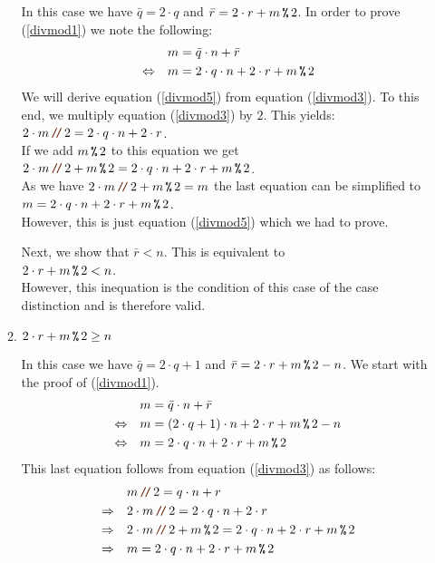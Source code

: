 \begin{enumerate}
\begin{enumerate}
    In this case we have $\bar{q} = 2 \cdot q$ and $\bar{r} = 2 \cdot r + m \,\texttt{\%}\, 2$.
    In order to prove (\ref{divmod1}) we note the following:
    \begin{align}
                           &  m = \bar{q} \cdot n + \bar{r} \\
      \Leftrightarrow\quad & m = 2 \cdot q \cdot n + 2 \cdot r + m \,\texttt{\%}\, 2 \label{divmod5}
    \end{align}
    We will derive equation (\ref{divmod5}) from equation (\ref{divmod3}).  To this end, we multiply equation
    (\ref{divmod3}) by $2$.  This yields:
    \\[0.2cm]
    \hspace*{1.3cm}
    $2 \cdot m \dv 2 = 2 \cdot q \cdot n + 2 \cdot r$.
    \\[0.2cm]
    If we add $m \,\texttt{\%}\, 2$ to this equation we get
    \\[0.2cm]
    \hspace*{1.3cm}
    $2 \cdot m \dv 2 + m \mmod 2 = 2 \cdot q \cdot n + 2 \cdot r + m \mmod 2$.
    \\[0.2cm]
    As we have $2 \cdot m \dv 2 + m \mmod 2 = m$ the last equation can be simplified to
    \\[0.2cm]
    \hspace*{1.3cm}
    $m = 2 \cdot q \cdot n + 2 \cdot r + m \,\texttt{\%}\, 2$.
    \\[0.2cm]
    However, this is just equation (\ref{divmod5}) which we had to prove. \mycheck

    Next, we show that $\bar{r} < n$.  This is equivalent to
    \\[0.2cm]
    \hspace*{1.3cm}
    $2 \cdot r + m \,\texttt{\%}\, 2 < n$.
    \\[0.2cm]
    However, this inequation is the condition of this case of the case distinction and is therefore valid. \mycheck
  \item $2 \cdot r + m \,\texttt{\%}\, 2 \geq n$

    In this case we have $\bar{q} = 2 \cdot q + 1$ and $\bar{r} = 2 \cdot r + m \,\texttt{\%}\, 2 - n$.
    We start with the proof of (\ref{divmod1}).
    \begin{align*}
                           & m = \bar{q} \cdot n + \bar{r} \\
      \Leftrightarrow\quad & m = (2 \cdot q + 1) \cdot n + 2 \cdot r + m \,\texttt{\%}\, 2 - n \\
      \Leftrightarrow\quad & m = 2 \cdot q \cdot n + 2 \cdot r + m \,\texttt{\%}\, 2 
    \end{align*}
    This last equation follows from equation (\ref{divmod3}) as follows:
    \begin{align*}
                       & m \dv 2 = q \cdot n + r \\
      \Rightarrow\quad & 2 \cdot m \dv 2 = 2 \cdot q \cdot n + 2 \cdot r \\
      \Rightarrow\quad & 2 \cdot m \dv 2 + m \mmod 2 = 2 \cdot q \cdot n + 2 \cdot r + m \mmod 2 \\
      \Rightarrow\quad & m = 2 \cdot q \cdot n + 2 \cdot r + m \mmod 2 
    \end{align*}


\end{enumerate}
\end{enumerate}
